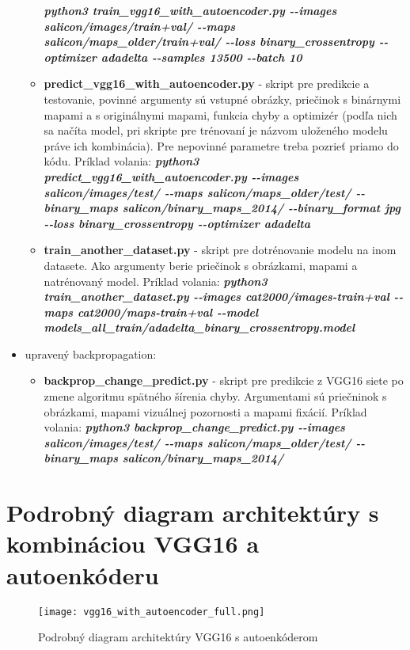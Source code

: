 \begin{itemize}
\begin{itemize}
			\textbf{\textit{
			python3 train\_vgg16\_with\_autoencoder.py -{}-images salicon/images/train+val/  -{}-maps salicon/maps\_older/train+val/ -{}-loss binary\_crossentropy -{}-optimizer adadelta -{}-samples 13500 -{}-batch 10}}
			\item \textbf{predict\_vgg16\_with\_autoencoder.py} - skript pre predikcie a testovanie, povinné argumenty sú vstupné obrázky, priečinok s binárnymi mapami a s originálnymi mapami, funkcia chyby a optimizér (podľa nich sa načíta model, pri skripte pre trénovaní je názvom uloženého modelu práve ich kombinácia). Pre nepovinné parametre treba pozrieť priamo do kódu. Príklad volania: 
			\textbf{\textit{python3 predict\_vgg16\_with\_autoencoder.py -{}-images salicon/images/test/ -{}-maps salicon/maps\_older/test/ -{}-binary\_maps salicon/binary\_maps\_2014/ -{}-binary\_format jpg -{}-loss binary\_crossentropy -{}-optimizer adadelta}}
			\item \textbf{train\_another\_dataset.py} - skript pre dotrénovanie modelu na inom datasete. Ako argumenty berie priečinok s obrázkami, mapami a natrénovaný model. Príklad volania: \textbf{\textit{python3 train\_another\_dataset.py -{}-images cat2000/images-train+val  -{}-maps cat2000/maps-train+val -{}-model models\_all\_train/adadelta\_binary\_crossentropy.model}}
		\end{itemize}
	\item upravený backpropagation:
		\begin{itemize}
			\item \textbf{backprop\_change\_predict.py} - skript pre predikcie z VGG16 siete po zmene algoritmu spätného šírenia chyby. Argumentami sú priečninok s obrázkami, mapami vizuálnej pozornosti a mapami fixácií. Príklad volania: \textbf{\textit{python3 backprop\_change\_predict.py -{}-images salicon/images/test/ -{}-maps salicon/maps\_older/test/ -{}-binary\_maps salicon/binary\_maps\_2014/}}
		\end{itemize}
\end{itemize}

\section{Podrobný diagram architektúry s kombináciou VGG16 a autoenkóderu}
\label{vgg16_autoencoder_architecture_detailed}
\begin{figure}[H]
	\begin{center}
		\texttt{[image: vgg16\_with\_autoencoder\_full.png]}
		\caption[Podrobný diagram architektúry VGG16 s autoenkóderom]{Podrobný diagram architektúry VGG16 s autoenkóderom}
	\end{center}
\end{figure}


